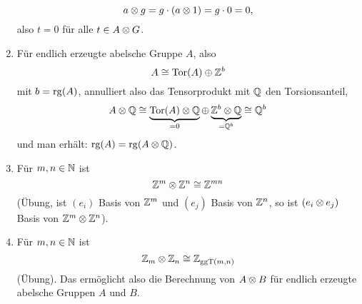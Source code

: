 \begin{beispiel}
\begin{enumerate}
\begin{equation*}
        a \otimes g = g \cdot (a \otimes 1) = g \cdot 0 = 0,
      \end{equation*}
      also $t = 0$ für alle $t \in A \otimes G$.
    \item
      Für endlich erzeugte abelsche Gruppe $A$, also
      \begin{equation*}
        A \cong \mathrm{Tor}(A) \oplus \mathbb{Z}^b
      \end{equation*}
      mit $b = \operatorname{rg}(A)$, annulliert also das Tensorprodukt mit $\mathbb{Q}$ den Torsionsanteil,
      \begin{equation*}
        A \otimes \mathbb{Q} \cong \underbrace{\mathrm{Tor}(A) \otimes \mathbb{Q}}_{= 0} \oplus \underbrace{\mathbb{Z}^b \otimes \mathbb{Q}}_{= \mathbb{Q}^b} \cong \mathbb{Q}^b
      \end{equation*}
      und man erhält: $\operatorname{rg}(A) = \operatorname{rg}(A \otimes \mathbb{Q})$.
    \item
      Für $m, n \in \mathbb{N}$ ist
      \begin{equation*}
        \mathbb{Z}^m \otimes \mathbb{Z}^n \cong \mathbb{Z}^{mn}
      \end{equation*}
      (Übung, ist $(e_i)$ Basis von $\mathbb{Z}^m$ und $(e_j)$ Basis von $\mathbb{Z}^n$, so ist $(e_i \otimes e_j)$ Basis von $\mathbb{Z}^m \otimes \mathbb{Z}^n$).
    \item
      Für $m,n \in \mathbb{N}$ ist
      \begin{equation*}
        \mathbb{Z}_m \otimes \mathbb{Z}_n \cong \mathbb{Z}_{\mathrm{ggT}(m,n)}
      \end{equation*}
      (Übung).
      Das ermöglicht also die Berechnung von $A \otimes B$ für endlich erzeugte abelsche Gruppen $A$ und $B$.
  \end{enumerate}
\end{beispiel}

